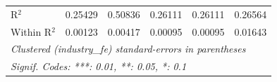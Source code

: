 \begin{tabular}{lccccc}
   R$^2$                                        & 0.25429             & 0.50836            & 0.26111                        & 0.26111                         & 0.26564\\  
   Within R$^2$                                 & 0.00123             & 0.00417            & 0.00095                        & 0.00095                         & 0.01643\\  
   \midrule \midrule
   \multicolumn{6}{l}{\emph{Clustered (industry\_fe) standard-errors in parentheses}}\\
   \multicolumn{6}{l}{\emph{Signif. Codes: ***: 0.01, **: 0.05, *: 0.1}}\\
\end{tabular}
\par\endgroup
